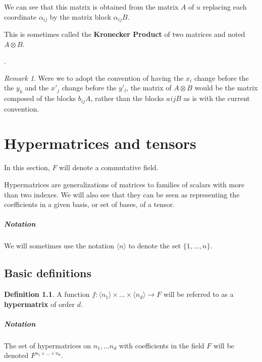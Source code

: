 \documentclass{report}
\theoremstyle{definition}
\newtheorem{defin}{Definition}
\theoremstyle{remark}
\newtheorem{remark}{Remark}
\begin{document}
    We can see that this matrix is obtained from the matrix $A$ of $u$ replacing each coordinate $\alpha_{ij}$ by the matrix block $\alpha_{ij}B$.
    
    This is sometimes called the \textbf{Kronecker Product} of two matrices and noted $A \otimes B$.
    
.
  
  \begin{remark}
  Were we to adopt the convention of having the $x_i$ change before the the $y_k$ and the $x'_j$ change before the $y'_l$, the matrix of $A \otimes B$ would be the matrix composed of the blocks $b_{ij}A$, rather than the blocks $a_{}ijB$ as is with the current convention. 
  \end{remark}
  
  



\chapter{Hypermatrices and tensors}
In this section, $F$ will denote a commutative field.


Hypermatrices are generalizations of matrices to families of scalars with more than two indexes. We will also see that they can be seen as representing the coefficients in a given basis, or set of bases, of a tensor. 


\paragraph{Notation} We will sometimes use the notation $\langle n \rangle$ to denote the set $\{1,\dots,n\}$.


\section{Basic definitions}
\begin{defin}
        A function  $f: \langle n_1 \rangle \times \dots \times \langle n_d \rangle \to F$ will be referred to as a \textbf{hypermatrix} of order $d$.

\end{defin}

\paragraph{Notation}
 The set of hypermatrices on $n_1, \dots n_d$ with coefficients in the field $F$ will be denoted $F^{n_1 \times \dots \times n_d}$.
\end{document}
